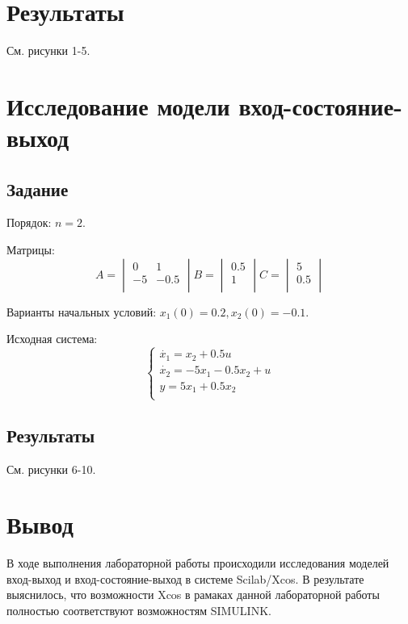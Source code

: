 \documentclass[12pt, a4paper] {ncc}
\begin{document}
		\section{Результаты}

			См. рисунки 1-5.


\section{Исследование модели вход-состояние-выход}
    \subsection{Задание}
		Порядок: $n = 2$.

		Матрицы:
		\[A = 
		\begin{vmatrix}
			0  & 1 \\
			-5 & -0.5 \\
		\end{vmatrix}
		B = 
		\begin{vmatrix}
			0.5 \\
			1 \\
		\end{vmatrix}
		C = 
		\begin{vmatrix}
			5 \\
			0.5 \\
		\end{vmatrix}
		\]

		Варианты начальных условий: $x_1(0) = 0.2, x_2(0) = -0.1$.

		Исходная система:\\
		\[
			\begin{cases}
				\dot{x_1} = x_2 + 0.5 u\\
				\dot{x_2} = -5 x_1 - 0.5 x_2 + u\\
				y = 5 x_1 + 0.5 x_2 \\
			\end{cases}
		\]

	\subsection{Результаты}
			См. рисунки 6-10.
    \section{Вывод}

        В ходе выполнения лабораторной работы происходили исследования моделей вход-выход и вход-состояние-выход в
        системе Scilab/Xcos. В результате выяснилось, что возможности Xcos в рамаках данной лабораторной работы
        полностью соответствуют возможностям SIMULINK.
\end{document}
